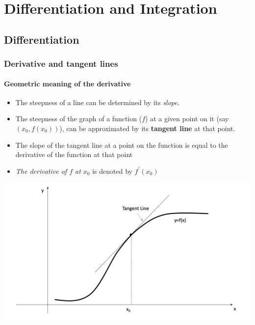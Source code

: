 \documentclass[]{book}
\providecommand{\tightlist}{%
  \setlength{\itemsep}{0pt}\setlength{\parskip}{0pt}}
\begin{document}
\hypertarget{differentiation-and-integration}{%
\chapter{Differentiation and Integration}\label{differentiation-and-integration}}


\hypertarget{differentiation}{%
\section{Differentiation}\label{differentiation}}

\hypertarget{derivative-and-tangent-lines}{%
\subsection{Derivative and tangent lines}\label{derivative-and-tangent-lines}}

\hypertarget{geometric-meaning-of-the-derivative}{%
\subsubsection{Geometric meaning of the derivative}\label{geometric-meaning-of-the-derivative}}

\begin{itemize}
\tightlist
\item
  The steepness of a line can be determined by its \emph{slope}.
\item
  The steepness of the graph of a function (\(f\)) at a given point on it (say \((x_0, f{(x_0)})\)), can be approximated by its \textbf{tangent line} at that point.
\item
  The slope of the tangent line at a point on the function is equal to the derivative of the function at that point
\item
  \emph{The derivative of \(f\) at \(x_0\)} is denoted by \(f^\prime (x_0)\)
\end{itemize}

\begin{center}\includegraphics[width=0.7\linewidth]{figure/5Derivatives-1} \end{center}
\end{document}
